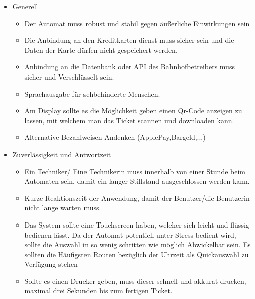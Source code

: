\documentclass[12pt]{article}
\begin{document}
\begin{itemize}
 \item Generell
\begin{itemize}
  \item Der Automat muss robust und stabil gegen äußerliche Einwirkungen sein
  \item Die Anbindung an den Kreditkarten dienst muss sicher sein und die Daten der Karte dürfen nicht gespeichert werden.
  \item Anbindung an die Datenbank oder API des Bahnhofbetreibers muss sicher und Verschlüsselt sein.
  \item Sprachausgabe für sehbehinderte Menschen.
  \item Am Display sollte es die Möglichkeit geben einen Qr-Code anzeigen zu lassen, mit welchem man das Ticket scannen und downloaden kann.
  \item Alternative Bezahlweisen Andenken (ApplePay,Bargeld,...)
\end{itemize}
 \item Zuverlässigkeit und Antwortzeit
\begin{itemize}
 \item Ein Techniker/ Eine Technikerin muss innerhalb von einer Stunde beim Automaten sein, damit ein langer Stillstand ausgeschlossen werden kann.
 \item Kurze Reaktionszeit der Anwendung, damit der Benutzer/die Benutzerin nicht lange warten muss.
 \item Das System sollte eine Touchscreen haben, welcher sich leicht und flüssig bedienen lässt. Da der Automat potentiell unter Stress bedient wird, sollte die Auswahl in so wenig schritten wie möglich Abwickelbar sein. Es sollten die Häufigsten Routen bezüglich der Uhrzeit als Quickauswahl zu Verfügung stehen
 \item Sollte es einen Drucker geben, muss dieser schnell und akkurat drucken, maximal drei Sekunden bis zum fertigen Ticket.
\end{itemize}
\end{itemize}
\end{document}
